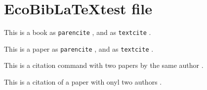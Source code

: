 \documentclass{article}
\begin{document}
 
\section*{EcoBib\LaTeX test file}

This is a book as \texttt{parencite} \parencite{Darwin1859}, and as \texttt{textcite}
\textcite{Elton1927}.

This is a paper as \texttt{parencite} \parencite{Holt1996}, and as \texttt{textcite}
\textcite{Anderson2011}.

This is a citation command with two papers by the same author \parencite{Tuomisto2010,Tuomisto2011}.

This is a citation of a paper with onyl two authors \parencite{PoisotBJLS2010}.

\printbibliography
\end{document}
